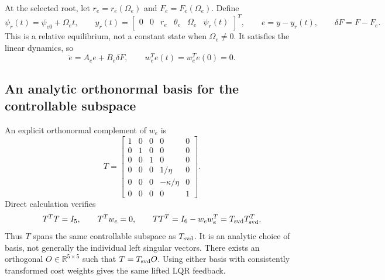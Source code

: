 At the selected root, let $r_e=r_e(\Omega_e)$ and $F_e=F_e(\Omega_e)$.
Define
\begin{equation}
\psi_r(t)=\psi_{e0}+\Omega_e t,\qquad
y_r(t)=\begin{bmatrix}0&0&r_e&\theta_e&\Omega_e&\psi_r(t)\end{bmatrix}^T,
\qquad e=y-y_r(t),\qquad \delta F=F-F_e.
\end{equation}
This is a relative equilibrium, not a constant state when $\Omega_e\ne0$.
It satisfies the linear dynamics, so
\begin{equation}
\dot e=A_e e+B_e\delta F,\qquad
w_e^Te(t)=w_e^Te(0)=0.
\end{equation}

\subsection{An analytic orthonormal basis for the controllable subspace}

An explicit orthonormal complement of $w_e$ is
\begin{equation}
\boxed{
T=\begin{bmatrix}
1&0&0&0&0\\
0&1&0&0&0\\
0&0&1&0&0\\
0&0&0&1/\eta&0\\
0&0&0&-\kappa/\eta&0\\
0&0&0&0&1
\end{bmatrix}.}
\end{equation}
Direct calculation verifies
\begin{equation}
T^TT=I_5,\qquad T^Tw_e=0,\qquad
TT^T=I_6-w_ew_e^T=T_{\rm svd}T_{\rm svd}^T.
\end{equation}
Thus $T$ spans the same controllable subspace as $T_{\rm svd}$.
It is an analytic choice of basis, not generally the individual left
singular vectors. There exists an orthogonal $O\in\mathbb R^{5\times5}$
such that $T=T_{\rm svd}O$. Using either basis with consistently
transformed cost weights gives the same lifted LQR feedback.

